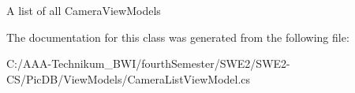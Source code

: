 A list of all Camera\+View\+Models 



The documentation for this class was generated from the following file\+:\begin{DoxyCompactItemize}
\item 
C\+:/\+A\+A\+A-\/\+Technikum\+\_\+\+B\+W\+I/fourth\+Semester/\+S\+W\+E2/\+S\+W\+E2-\/\+C\+S/\+Pic\+D\+B/\+View\+Models/Camera\+List\+View\+Model.\+cs\end{DoxyCompactItemize}
